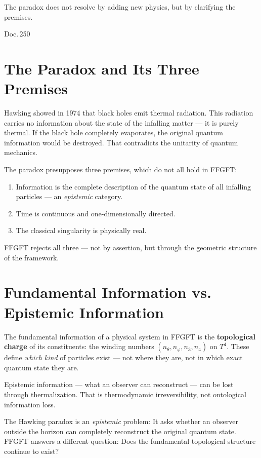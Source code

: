 \label{ch:hawking_info}

\epigraph{The paradox does not resolve by adding new physics,
but by clarifying the premises.}{Doc.\,250}

\section{The Paradox and Its Three Premises}

Hawking showed in 1974 that black holes emit thermal radiation.
This radiation carries no information about the state of the infalling
matter --- it is purely thermal. If the black hole completely
evaporates, the original quantum information would be destroyed. That
contradicts the unitarity of quantum mechanics.

The paradox presupposes three premises, which do not all hold in FFGFT:

\begin{enumerate}
  \item Information is the complete description of the quantum state
    of all infalling particles --- an \emph{epistemic} category.
  \item Time is continuous and one-dimensionally directed.
  \item The classical singularity is physically real.
\end{enumerate}

FFGFT rejects all three --- not by assertion, but
through the geometric structure of the framework.

\section{Fundamental Information vs. Epistemic Information}

\begin{keyresult}
The fundamental information of a physical system in FFGFT is the
\textbf{topological charge} of its constituents: the winding numbers
$(n_\theta, n_\varphi, n_3, n_4)$ on $T^4$. These define \emph{which
kind} of particles exist --- not where they are, not in which exact
quantum state they are.
\end{keyresult}

Epistemic information --- what an observer can reconstruct ---
can be lost through thermalization. That is thermodynamic
irreversibility, not ontological information loss.

The Hawking paradox is an \emph{epistemic} problem: It asks whether an
observer outside the horizon can completely reconstruct the original quantum state.
FFGFT answers a different question:
Does the fundamental topological structure continue to exist?

